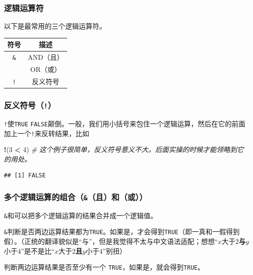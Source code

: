 \documentclass[]{book}
\newenvironment{Shaded}{\begin{snugshade}}{\end{snugshade}}
\newcommand{\CommentTok}[1]{\textcolor[rgb]{0.56,0.35,0.01}{\textit{#1}}}
\newcommand{\DecValTok}[1]{\textcolor[rgb]{0.00,0.00,0.81}{#1}}
\newcommand{\NormalTok}[1]{#1}
\newcommand{\OperatorTok}[1]{\textcolor[rgb]{0.81,0.36,0.00}{\textbf{#1}}}
\newcommand{\StringTok}[1]{\textcolor[rgb]{0.31,0.60,0.02}{#1}}
\begin{document}
\subsubsection{逻辑运算符}

以下是最常用的三个逻辑运算符。

\begin{longtable}[]{@{}cc@{}}
\toprule
符号 & 描述\tabularnewline
\midrule
\endhead
\texttt{\&} & AND（且）\tabularnewline
\texttt{\textbar{}} & OR（或）\tabularnewline
\texttt{!} & 反义符号\tabularnewline
\bottomrule
\end{longtable}

\subsubsection{\texorpdfstring{反义符号（\texttt{!}）}{反义符号（!）}}

\texttt{!}使\texttt{TRUE} \texttt{FALSE}颠倒。一般，我们用小括号来包住一个逻辑运算，然后在它的前面加上一个\texttt{!}来反转结果，比如

\begin{Shaded}
\begin{Highlighting}[]
\OperatorTok{!}\NormalTok{(}\DecValTok{3} \OperatorTok{<}\StringTok{ }\DecValTok{4}\NormalTok{) }\CommentTok{# 这个例子很简单，反义符号意义不大。后面实操的时候才能领略到它的用处。}
\end{Highlighting}
\end{Shaded}

\begin{verbatim}
## [1] FALSE
\end{verbatim}

\subsubsection{\texorpdfstring{多个逻辑运算的组合（\texttt{\&}（且）和\texttt{\textbar{}}（或））}{多个逻辑运算的组合（\&（且）和\textbar{}（或））}}

\texttt{\&}和\texttt{\textbar{}}可以把多个逻辑运算的结果合并成一个逻辑值。

\texttt{\&}判断是否两边运算结果都为\texttt{TRUE}。如果是，才会得到\texttt{TRUE}（即一真和一假得到假）。（正统的翻译貌似是``与''，但是我觉得不太与中文语法适配；想想``\(x\)大于\(2\)\textbf{与}\(y\)小于\(4\)''是不是比``\(x\)大于\(2\)\textbf{且}\(y\)小于\(4\)''别扭）

\texttt{\textbar{}}判断两边运算结果是否至少有一个 \texttt{TRUE}，如果是，就会得到\texttt{TRUE}。
\end{document}
